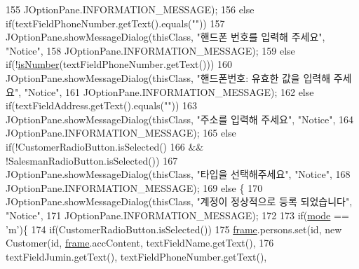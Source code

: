 \begin{DoxyCode}
155                             JOptionPane.INFORMATION\_MESSAGE);
156                 \textcolor{keywordflow}{else} \textcolor{keywordflow}{if}(textFieldPhoneNumber.getText().equals(\textcolor{stringliteral}{""}))
157                     JOptionPane.showMessageDialog(thisClass, \textcolor{stringliteral}{"핸드폰 번호를 입력해 주세요"}, \textcolor{stringliteral}{"Notice"}, 
158                             JOptionPane.INFORMATION\_MESSAGE);
159                 \textcolor{keywordflow}{else} \textcolor{keywordflow}{if}(!\hyperlink{classpkg_1_1_person_u_i_ac378af5584fc8f7bfddb1b05eb0f7289}{isNumber}(textFieldPhoneNumber.getText()))
160                     JOptionPane.showMessageDialog(thisClass, \textcolor{stringliteral}{"핸드폰번호: 유효한 값을 입력해 주세요"}, \textcolor{stringliteral}{"Notice"}, 
161                             JOptionPane.INFORMATION\_MESSAGE);
162                 \textcolor{keywordflow}{else} \textcolor{keywordflow}{if}(textFieldAddress.getText().equals(\textcolor{stringliteral}{""}))
163                     JOptionPane.showMessageDialog(thisClass, \textcolor{stringliteral}{"주소를 입력해 주세요"}, \textcolor{stringliteral}{"Notice"}, 
164                             JOptionPane.INFORMATION\_MESSAGE);
165                 \textcolor{keywordflow}{else} \textcolor{keywordflow}{if}(!CustomerRadioButton.isSelected()
166                         && !SalesmanRadioButton.isSelected())
167                     JOptionPane.showMessageDialog(thisClass, \textcolor{stringliteral}{"타입을 선택해주세요"}, \textcolor{stringliteral}{"Notice"}, 
168                             JOptionPane.INFORMATION\_MESSAGE);
169                 \textcolor{keywordflow}{else} \{
170                     JOptionPane.showMessageDialog(thisClass, \textcolor{stringliteral}{"계정이 정상적으로 등록 되었습니다"}, \textcolor{stringliteral}{"Notice"}, 
171                             JOptionPane.INFORMATION\_MESSAGE);
172                     
173                     \textcolor{keywordflow}{if}(\hyperlink{classpkg_1_1_person_u_i_a1e904b333d5a5ed5fccbd652278af776}{mode} == \textcolor{charliteral}{'m'})\{
174                         \textcolor{keywordflow}{if}(CustomerRadioButton.isSelected())
175                             \hyperlink{classpkg_1_1_person_u_i_ab7d796c52a55426d71e77f6496bd4012}{frame}.persons.set(\textcolor{keywordtype}{id}, \textcolor{keyword}{new} Customer(\textcolor{keywordtype}{id}, \hyperlink{classpkg_1_1_person_u_i_ab7d796c52a55426d71e77f6496bd4012}{frame}.accContent, 
      textFieldName.getText(),
176                                     textFieldJumin.getText(), textFieldPhoneNumber.getText(), 

\end{DoxyCode}
